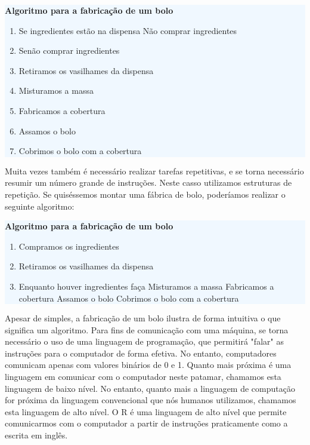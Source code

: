 \vspace{0.5cm}
\colorbox{aliceblue}{\begin{minipage}{\textwidth}
\textbf{Algoritmo para a fabricação de um bolo} 
\begin{enumerate}
	\item Se ingredientes estão na dispensa 
	\subitem Não comprar ingredientes
	\item Senão 
	\subitem comprar ingredientes
	\item Retiramos os vasilhames da dispensa 
	\item Misturamos a massa 
	\item Fabricamos a cobertura 
	\item Assamos o bolo 
	\item Cobrimos o bolo com a cobertura
\end{enumerate} 
\end{minipage}}
\vspace{0.5cm}


Muita vezes também é necessário realizar tarefas repetitivas, e se torna necessário resumir um número grande de instruções. Neste casso utilizamos estruturas de repetição. Se quiséssemos montar uma fábrica de bolo, poderíamos realizar o seguinte algoritmo:

\vspace{0.5cm}
\colorbox{aliceblue}{\begin{minipage}{\textwidth}	
\textbf{Algoritmo para a fabricação de um bolo}
\begin{enumerate}
	\item Compramos os ingredientes
	\item Retiramos os vasilhames da dispensa  
	\item Enquanto houver ingredientes faça
	\subitem Misturamos a massa 
	\subitem Fabricamos a cobertura 
	\subitem Assamos o bolo 
	\subitem Cobrimos o bolo com a cobertura
\end{enumerate} 
\end{minipage}}
\vspace{0.5cm}

Apesar de simples, a fabricação de um bolo ilustra de forma intuitiva o que significa um algoritmo. Para fins de comunicação com uma máquina, se torna necessário o uso de uma linguagem de programação, que permitirá "falar" as instruções para o computador de forma efetiva. No entanto, computadores comunicam apenas com valores binários de 0 e 1. Quanto mais próxima é uma linguagem em comunicar com o computador neste patamar, chamamos esta linguagem de baixo nível. No entanto, quanto mais a linguagem de computação for próxima da linguagem convencional que nós humanos utilizamos, chamamos esta linguagem de alto nível. O R é uma linguagem de alto nível que permite comunicarmos com o computador a partir de instruções praticamente como a escrita em inglês.

